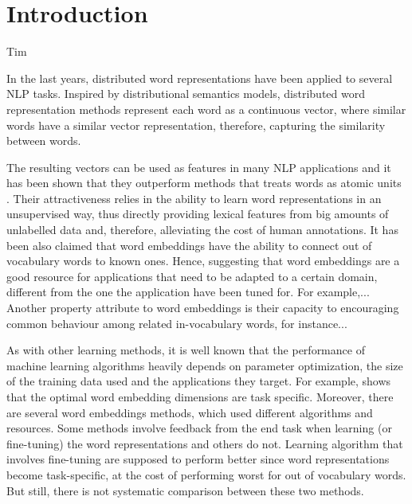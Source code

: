 \section{Introduction}

{\color{red}Tim}

In the last years, distributed word representations
have been applied to several NLP tasks.
Inspired by distributional semantics models, distributed word
representation methods represent each word as a continuous vector, where similar words have a similar vector representation, therefore, capturing the similarity between words.

The resulting vectors can be used as features in many NLP applications and it has been shown that they outperform methods that treats words as atomic units \cite{}.  
Their attractiveness relies in the ability to learn word representations in an unsupervised way, thus directly providing lexical features from big amounts of unlabelled data 
and, therefore, alleviating the cost of human annotations.
It has been also claimed that word embeddings
have the ability to connect out of vocabulary words to known ones.
Hence, suggesting that word embeddings are a good resource 
for applications that need to be adapted to a certain domain, 
different from the one the application have been tuned for.
For example,...
Another property attribute to word embeddings is their 
capacity to encouraging common behaviour among related in-vocabulary words, for instance...


As with other learning methods, it is well known that
the performance of machine learning algorithms heavily depends on
parameter optimization, the size of the training data used and the applications they target.
For example, \cite{turian2010word} shows that the optimal word embedding dimensions are task specific.
Moreover, there are several word embeddings methods, which used different algorithms and resources. 
Some methods involve feedback from the end task when learning (or fine-tuning) the word representations and others do not. 
Learning algorithm that involves fine-tuning are supposed
to perform better since word representations become
task-specific, at the cost of performing worst for out of vocabulary 
words. But still, there is not systematic comparison between
these two methods. 



